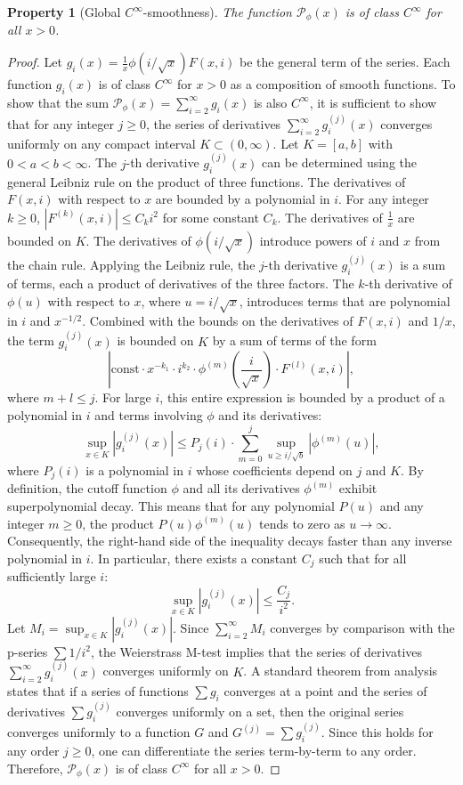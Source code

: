 \documentclass[11pt,a4paper]{amsart}
\newcommand{\Px}{\mathcal{P}}
\theoremstyle{plain}
\newtheorem{property}[theorem]{Property}
\theoremstyle{definition}
\begin{document}
\begin{property}[Global $C^\infty$-smoothness]\label{prop:Cinf}
The function $\Px_{\phi}(x)$ is of class $C^\infty$ for all $x>0$.
\end{property}
\begin{proof}
Let $g_i(x) = \frac{1}{x} \phi(i/\sqrt{x}) F(x,i)$ be the general term of the series. Each function $g_i(x)$ is of class $C^\infty$ for $x>0$ as a composition of smooth functions. To show that the sum $\Px_{\phi}(x) = \sum_{i=2}^{\infty} g_i(x)$ is also $C^\infty$, it is sufficient to show that for any integer $j \ge 0$, the series of derivatives $\sum_{i=2}^{\infty} g_i^{(j)}(x)$ converges uniformly on any compact interval $K \subset (0, \infty)$.
Let $K=[a,b]$ with $0 < a < b < \infty$.
The $j$-th derivative $g_i^{(j)}(x)$ can be determined using the general Leibniz rule on the product of three functions. The derivatives of $F(x,i)$ with respect to $x$ are bounded by a polynomial in $i$. For any integer $k \ge 0$, $|F^{(k)}(x,i)| \le C_k i^2$ for some constant $C_k$. The derivatives of $\frac{1}{x}$ are bounded on $K$. The derivatives of $\phi(i/\sqrt{x})$ introduce powers of $i$ and $x$ from the chain rule.
Applying the Leibniz rule, the $j$-th derivative $g_i^{(j)}(x)$ is a sum of terms, each a product of derivatives of the three factors. The $k$-th derivative of $\phi(u)$ with respect to $x$, where $u=i/\sqrt{x}$, introduces terms that are polynomial in $i$ and $x^{-1/2}$. Combined with the bounds on the derivatives of $F(x,i)$ and $1/x$, the term $g_i^{(j)}(x)$ is bounded on $K$ by a sum of terms of the form
\[ \left| \text{const} \cdot x^{-k_1} \cdot i^{k_2} \cdot \phi^{(m)}\left(\frac{i}{\sqrt{x}}\right) \cdot F^{(l)}(x,i) \right|, \]
where $m+l \le j$. For large $i$, this entire expression is bounded by a product of a polynomial in $i$ and terms involving $\phi$ and its derivatives:
\[ \sup_{x \in K} |g_i^{(j)}(x)| \le P_j(i) \cdot \sum_{m=0}^{j} \sup_{u \ge i/\sqrt{b}} |\phi^{(m)}(u)|, \]
where $P_j(i)$ is a polynomial in $i$ whose coefficients depend on $j$ and $K$.
By definition, the cutoff function $\phi$ and all its derivatives $\phi^{(m)}$ exhibit superpolynomial decay. This means that for any polynomial $P(u)$ and any integer $m \ge 0$, the product $P(u)\phi^{(m)}(u)$ tends to zero as $u \to \infty$. Consequently, the right-hand side of the inequality decays faster than any inverse polynomial in $i$. In particular, there exists a constant $C_j$ such that for all sufficiently large $i$:
\[ \sup_{x \in K} |g_i^{(j)}(x)| \le \frac{C_j}{i^2}. \]
Let $M_i = \sup_{x \in K} |g_i^{(j)}(x)|$. Since $\sum_{i=2}^{\infty} M_i$ converges by comparison with the p-series $\sum 1/i^2$, the Weierstrass M-test implies that the series of derivatives $\sum_{i=2}^{\infty} g_i^{(j)}(x)$ converges uniformly on $K$. A standard theorem from analysis states that if a series of functions $\sum g_i$ converges at a point and the series of derivatives $\sum g_i^{(j)}$ converges uniformly on a set, then the original series converges uniformly to a function $G$ and $G^{(j)} = \sum g_i^{(j)}$. Since this holds for any order $j \ge 0$, one can differentiate the series term-by-term to any order. Therefore, $\Px_{\phi}(x)$ is of class $C^\infty$ for all $x>0$.
\end{proof}
\end{document}
